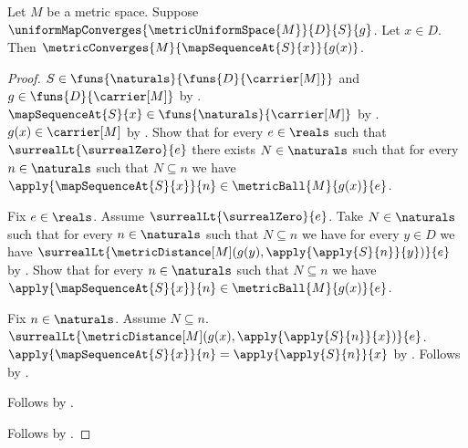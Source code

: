 \begin{theorem}\label{uniform_map_convergence_pointwise}
    Let $M$ be a metric space.
    Suppose $\uniformMapConverges
        {\metricUniformSpace{M}}{D}{S}{g}$.
    Let $x\in D$.
    Then $\metricConverges{M}{\mapSequenceAt{S}{x}}{g(x)}$.
\end{theorem}
\begin{proof}
    $S\in\funs{\naturals}{\funs{D}{\carrier[M]}}$ and
        $g\in\funs{D}{\carrier[M]}$
        by
        .
    $\mapSequenceAt{S}{x}\in\funs{\naturals}{\carrier[M]}$
        by .
    $g(x)\in\carrier[M]$ by .
    Show that for every $e\in\reals$ such that
        $\surrealLt{\surrealZero}{e}$ there exists $N\in\naturals$
        such that for every $n\in\naturals$ such that $N\subseteq n$
            we have
            $\apply{\mapSequenceAt{S}{x}}{n}\in
                \metricBall{M}{g(x)}{e}$.
    \begin{subproof}
        Fix $e\in\reals$.
        Assume $\surrealLt{\surrealZero}{e}$.
        Take $N\in\naturals$ such that for every $n\in\naturals$
            such that $N\subseteq n$ we have for every $y\in D$ we have
            $\surrealLt{\metricDistance[M]
                (g(y),\apply{\apply{S}{n}}{y})}{e}$
            by .
        Show that for every $n\in\naturals$ such that $N\subseteq n$
            we have $\apply{\mapSequenceAt{S}{x}}{n}
                \in\metricBall{M}{g(x)}{e}$.
        \begin{subproof}
            Fix $n\in\naturals$.
            Assume $N\subseteq n$.
            $\surrealLt{\metricDistance[M]
                (g(x),\apply{\apply{S}{n}}{x})}{e}$.
            $\apply{\mapSequenceAt{S}{x}}{n}
                =\apply{\apply{S}{n}}{x}$
                by .
            Follows by .
        \end{subproof}
        Follows by \auto.
    \end{subproof}
    Follows by .
\end{proof}

